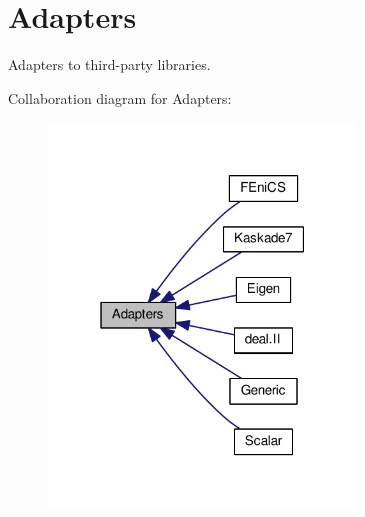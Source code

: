 \hypertarget{group__AdapterGroup}{\section{Adapters}
\label{group__AdapterGroup}
}


Adapters to third-\/party libraries.  


Collaboration diagram for Adapters\-:
\nopagebreak
\begin{figure}[H]
\begin{center}
\leavevmode
\includegraphics[width=232pt]{group__AdapterGroup}
\end{center}
\end{figure}
